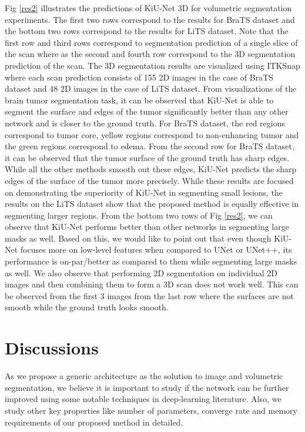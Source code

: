 \documentclass[journal,twoside,web]{ieeecolor}
\begin{document}
Fig \ref{res2} illustrates the predictions of KiU-Net 3D for volumetric segmentation experiments. The first two rows correspond to the results for BraTS dataset and the bottom two rows correspond to the results for LiTS dataset. Note that  the first row and third rows correspond  to segmentation prediction of a single slice of the scan where as the second and fourth row correspond to  the 3D segmentation prediction of the scan. The 3D segmentation results are   visualized using ITKSnap \cite{py06nimg} where each  scan prediction consists of 155 2D images in the  case of BraTS dataset and 48 2D images in the case of LiTS dataset. From  visualizations  of the brain tumor segmentation task, it can be observed that KiU-Net is able to  segment  the surface and edges of the tumor significantly better than any other network and is  closer to the ground truth. For BraTS dataset, the red regions correspond  to tumor core, yellow regions correspond  to non-enhancing tumor and the green regions correspond  to edema. From the second row for BraTS dataset, it can be observed that the tumor surface of the ground truth has sharp edges. While all the other methods smooth out these edges, KiU-Net predicts the sharp edges of the surface of the tumor more precisely.  
While these results are focused on demonstrating the superiority of KiU-Net in segmenting small lesions, the results on the LiTS dataset show that the proposed method is equally effective in segmenting larger regions.   From the bottom two rows of Fig \ref{res2}, we can observe that KiU-Net performs better than other networks in segmenting large masks as well. Based on this, we would like to point out that  even though KiU-Net focuses more on low-level features when compared to UNet or UNet++, its performance is on-par/better as compared to them while segmenting large masks as well. We also observe that performing 2D segmentation on individual 2D images and then combining them to form a 3D scan does not work well. This can be observed from the first 3 images from the last row where the surfaces are not smooth while the ground truth looks smooth. 





\section{Discussions}

As we propose a generic architecture as the solution to image and volumetric  segmentation, we believe it is important to study if the network can be further improved using some notable techniques in deep-learning literature. Also, we study other key properties like number of parameters, converge rate and memory requirements of our proposed method in detailed. 
\end{document}
